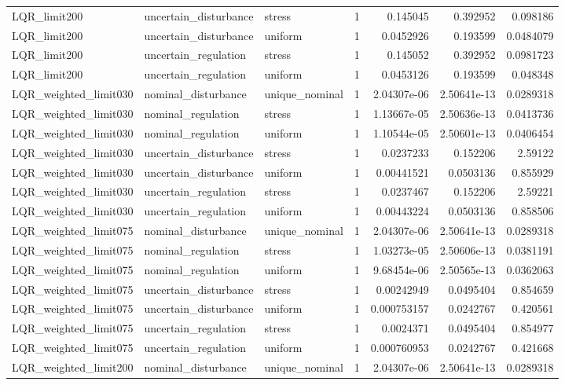\begin{tabular}{llllrrr}
LQR\_limit200 & uncertain\_disturbance & stress & 1 & 0.145045 & 0.392952 & 0.098186 \\
LQR\_limit200 & uncertain\_disturbance & uniform & 1 & 0.0452926 & 0.193599 & 0.0484079 \\
LQR\_limit200 & uncertain\_regulation & stress & 1 & 0.145052 & 0.392952 & 0.0981723 \\
LQR\_limit200 & uncertain\_regulation & uniform & 1 & 0.0453126 & 0.193599 & 0.048348 \\
LQR\_weighted\_limit030 & nominal\_disturbance & unique\_nominal & 1 & 2.04307e-06 & 2.50641e-13 & 0.0289318 \\
LQR\_weighted\_limit030 & nominal\_regulation & stress & 1 & 1.13667e-05 & 2.50636e-13 & 0.0413736 \\
LQR\_weighted\_limit030 & nominal\_regulation & uniform & 1 & 1.10544e-05 & 2.50601e-13 & 0.0406454 \\
LQR\_weighted\_limit030 & uncertain\_disturbance & stress & 1 & 0.0237233 & 0.152206 & 2.59122 \\
LQR\_weighted\_limit030 & uncertain\_disturbance & uniform & 1 & 0.00441521 & 0.0503136 & 0.855929 \\
LQR\_weighted\_limit030 & uncertain\_regulation & stress & 1 & 0.0237467 & 0.152206 & 2.59221 \\
LQR\_weighted\_limit030 & uncertain\_regulation & uniform & 1 & 0.00443224 & 0.0503136 & 0.858506 \\
LQR\_weighted\_limit075 & nominal\_disturbance & unique\_nominal & 1 & 2.04307e-06 & 2.50641e-13 & 0.0289318 \\
LQR\_weighted\_limit075 & nominal\_regulation & stress & 1 & 1.03273e-05 & 2.50606e-13 & 0.0381191 \\
LQR\_weighted\_limit075 & nominal\_regulation & uniform & 1 & 9.68454e-06 & 2.50565e-13 & 0.0362063 \\
LQR\_weighted\_limit075 & uncertain\_disturbance & stress & 1 & 0.00242949 & 0.0495404 & 0.854659 \\
LQR\_weighted\_limit075 & uncertain\_disturbance & uniform & 1 & 0.000753157 & 0.0242767 & 0.420561 \\
LQR\_weighted\_limit075 & uncertain\_regulation & stress & 1 & 0.0024371 & 0.0495404 & 0.854977 \\
LQR\_weighted\_limit075 & uncertain\_regulation & uniform & 1 & 0.000760953 & 0.0242767 & 0.421668 \\
LQR\_weighted\_limit200 & nominal\_disturbance & unique\_nominal & 1 & 2.04307e-06 & 2.50641e-13 & 0.0289318 \\

\end{tabular}
